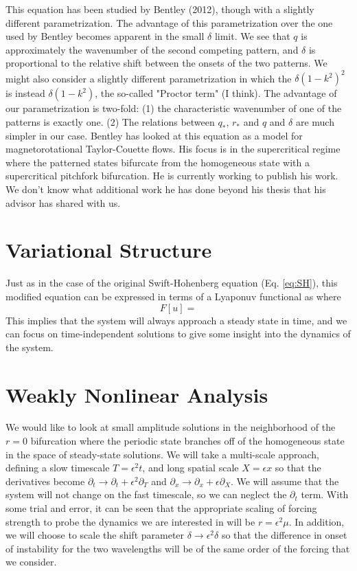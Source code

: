 \documentclass[api,pof,pre,12pt,a4paper]{revtex4-1}
\newcommand{\beqn}{\begin{equation}}
\newcommand{\eeqn}{\end{equation}}
\begin{document}
This equation has been studied by Bentley (2012), though with a slightly different parametrization.  The advantage of this parametrization over the one used by Bentley becomes apparent in the small $\delta$ limit.  We see that $q$ is approximately the wavenumber of the second competing pattern, and $\delta$ is proportional to the relative shift between the onsets of the two patterns.   We might also consider a slightly different parametrization in which the $\delta (1-k^2)^2$ is instead $\delta (1-k^2)$, the so-called "Proctor term" (I think).  The advantage of our parametrization is two-fold: (1) the characteristic wavenumber of one of the patterns is exactly one. (2) The relations between $q_*$, $r_*$ and $q$ and $\delta$ are much simpler in our case.    Bentley has looked at this equation as a model for magnetorotational Taylor-Couette flows.  His focus is in the supercritical regime where the patterned states bifurcate from the homogeneous state with a supercritical pitchfork bifurcation.  He is currently working to publish his work.  We don't know what additional work he has done beyond his thesis that his advisor has shared with us.

\section{Variational Structure}
Just as in the case of the original Swift-Hohenberg equation (Eq. \ref{eq:SH}), this modified equation can be expressed in terms of a Lyaponuv functional as 
where
\beqn
F[u]=
\eeqn
This implies that the system will always approach a steady state in time, and we can focus on time-independent solutions to give some insight into the dynamics of the system.

\section{Weakly Nonlinear Analysis}
We would like to look at small amplitude solutions in the neighborhood of the $r=0$ bifurcation where the periodic state branches off of the homogeneous state in the space of steady-state solutions.  We will take a multi-scale approach, defining a slow timescale $T=\epsilon^2t$, and long spatial scale $X=\epsilon x$ so that the derivatives become $\partial_t \rightarrow \partial_t+\epsilon^2\partial_T$ and $\partial_x \rightarrow \partial_x+\epsilon\partial_X$.  We will assume that the system will not change on the fast timescale, so we can neglect the $\partial_t$ term. With some trial and error, it can be seen that the appropriate scaling of forcing strength to probe the dynamics we are interested in will be $r=\epsilon^2 \mu$. In addition, we will choose to scale the shift parameter $\delta\rightarrow\epsilon^2 \delta$ so that the difference in onset of instability for the two wavelengths will be of the same order of the forcing that we consider.  
\end{document}
